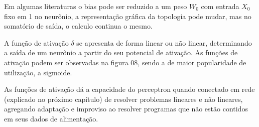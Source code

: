 \documentclass[	12pt, Times, openright, twoside, a4paper, english, brazil]{abntex2}
\begin{document}
            \begin{figure}[H]
            \end{figure}
			
			     Em algumas literaturas o bias pode ser reduzido a um peso $W_0$ com entrada $X_0$ fixo em 1 no neurônio, a representação gráfica da topologia pode mudar, mas no somatório de saída, o calculo continua o mesmo.
			
			     A função de ativação $\delta$ se apresenta de forma linear ou não linear, determinando a saída de um neurônio a partir do seu potencial de ativação. 
			     As funções de ativação podem ser observadas na figura 08, sendo a de maior popularidade de utilização, a sigmoide.
			
			     \begin{figure}[H]
			     \end{figure}
			
				    As funções de ativação dá a capacidade do perceptron quando conectado em rede (explicado no próximo capítulo) de resolver problemas lineares e não lineares, agregando adaptação e improviso ao resolver programas que não estão contidos em seus dados de alimentação.
			
\end{document}
